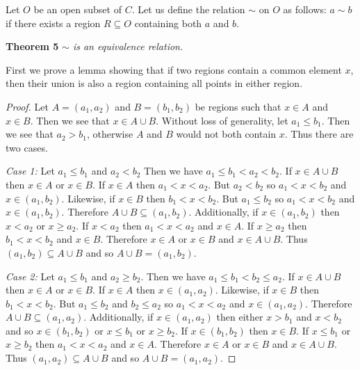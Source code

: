 \documentclass{article}
\begin{document}
\begin{flushleft}
Let $O$ be an open subset of $C$. Let us define the relation $\sim$ on $O$ as follows: $a \sim b$ if there exists a region $R \subseteq O$ containing both $a$ and $b$.\newline

\textbf{Theorem 5}
\textsl{$\sim$ is an equivalence relation.}\newline

First we prove a lemma showing that if two regions contain a common element $x$, then their union is also a region containing all points in either region.
\begin{proof}
Let $A=(a_1,a_2)$ and $B=(b_1,b_2)$ be regions such that $x \in A$ and $x \in B$. Then we see that $x \in A \cup B$. Without loss of generality, let $a_1 \leq b_1$. Then we see that $a_2>b_1$, otherwise $A$ and $B$ would not both contain $x$. Thus there are two cases.\newline

\textsl{Case 1:} Let $a_1 \leq b_1$ and $a_2<b_2$ Then we have $a_1 \leq b_1<a_2<b_2$. If $x \in A \cup B$ then $x \in A$ or $x \in B$. If $x \in A$ then $a_1<x<a_2$. But $a_2<b_2$ so $a_1<x<b_2$ and $x \in (a_1,b_2)$. Likewise, if $x \in B$ then $b_1<x<b_2$. But $a_1 \leq b_2$ so $a_1<x<b_2$ and $x \in (a_1,b_2)$. Therefore $A \cup B \subseteq (a_1,b_2)$. Additionally, if $x \in (a_1,b_2)$ then $x<a_2$ or $x \geq a_2$. If $x<a_2$ then $a_1<x<a_2$ and $x \in A$. If $x \geq a_2$ then $b_1<x<b_2$ and $x \in B$. Therefore $x \in A$ or $x \in B$ and $x \in A \cup B$. Thus $(a_1,b_2) \subseteq A \cup B$ and so $A \cup B = (a_1,b_2)$.\newline

\textsl{Case 2:} Let $a_1 \leq b_1$ and $a_2 \geq b_2$. Then we have $a_1 \leq b_1<b_2 \leq a_2$. If $x \in A \cup B$ then $x \in A$ or $x \in B$. If $x \in A$ then $x \in (a_1,a_2)$. Likewise, if $x \in B$ then $b_1<x<b_2$. But $a_1 \leq b_2$ and $b_2 \leq a_2$ so $a_1<x<a_2$ and $x \in (a_1,a_2)$. Therefore $A \cup B \subseteq (a_1,a_2)$. Additionally, if $x \in (a_1,a_2)$ then either $x>b_1$ and $x<b_2$ and so $x \in (b_1,b_2)$ or $x \leq b_1$ or $x \geq b_2$. If $x \in (b_1,b_2)$ then $x \in B$. If $x \leq b_1$ or $x \geq b_2$ then $a_1<x<a_2$ and $x \in A$. Therefore $x \in A$ or $x \in B$ and $x \in A \cup B$. Thus $(a_1,a_2) \subseteq A \cup B$ and so $A \cup B = (a_1,a_2)$.\newline


\end{proof}
\end{flushleft}
\end{document}
